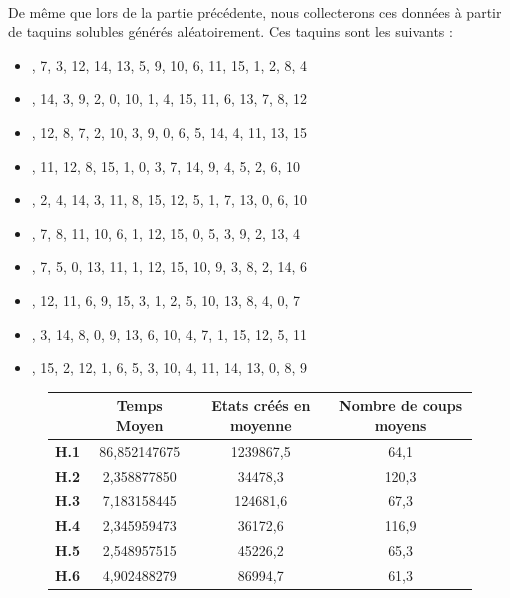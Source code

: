 \documentclass[10pt,a4paper]{report}
\begin{document}
\paragraph{}{De même que lors de la partie précédente, nous collecterons ces données à partir de taquins solubles générés aléatoirement. Ces taquins sont les suivants : }
\begin{itemize}
\item {}, 7, 3, 12, 14, 13, 5, 9, 10, 6, 11, 15, 1, 2, 8, 4\rbrack
\item {}, 14, 3, 9, 2, 0, 10, 1, 4, 15, 11, 6, 13, 7, 8, 12\rbrack
\item {}, 12, 8, 7, 2, 10, 3, 9, 0, 6, 5, 14, 4, 11, 13, 15\rbrack
\item {}, 11, 12, 8, 15, 1, 0, 3, 7, 14, 9, 4, 5, 2, 6, 10\rbrack
\item {}, 2, 4, 14, 3, 11, 8, 15, 12, 5, 1, 7, 13, 0, 6, 10\rbrack
\item {}, 7, 8, 11, 10, 6, 1, 12, 15, 0, 5, 3, 9, 2, 13, 4\rbrack
\item {}, 7, 5, 0, 13, 11, 1, 12, 15, 10, 9, 3, 8, 2, 14, 6\rbrack
\item {}, 12, 11, 6, 9, 15, 3, 1, 2, 5, 10, 13, 8, 4, 0, 7\rbrack
\item {}, 3, 14, 8, 0, 9, 13, 6, 10, 4, 7, 1, 15, 12, 5, 11\rbrack
\item {}, 15, 2, 12, 1, 6, 5, 3, 10, 4, 11, 14, 13, 0, 8, 9\rbrack
\end{itemize}

{\scriptsize{}
\renewcommand{\arraystretch}{1.3}
\vspace*{1cm}
\begin{figure}[h!]
\centering
\begin{tabular}{| c | c | c | c |} \hline
\textbf{ } & \textbf{Temps Moyen} & \textbf{Etats créés en moyenne} & \textbf{Nombre de coups moyens}\\ \hline
\textbf{H.1} & 86,852147675 & 1239867,5 & 64,1 \\ \hline
\textbf{H.2} & 2,358877850 & 34478,3 & 120,3 \\ \hline
\textbf{H.3} & 7,183158445 & 124681,6 & 67,3 \\ \hline
\textbf{H.4} & 2,345959473 & 36172,6 & 116,9 \\ \hline
\textbf{H.5} & 2,548957515 & 45226,2 & 65,3\\ \hline
\textbf{H.6} & 4,902488279 & 86994,7 & 61,3 \\ \hline
\end{tabular}
\end{figure}
\vspace*{1cm}
}
\paragraph{}{}
\end{document}
